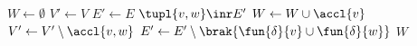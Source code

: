 \State $W\gets\emptyset$
\State $V'\gets V$
\State $E'\gets E$
\State $\tupl{v,w}\inr E'$
\State $W\gets W\cup\accl{v}$
\State $V'\gets V'\setminus\accl{v,w}$
\State $E'\gets E'\setminus\brak{\fun{\delta}{v}\cup\fun{\delta}{w}}$
\EndWhile
\State \Return $W$
\EndFunction
